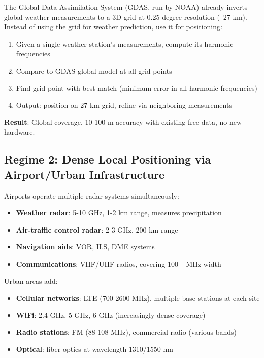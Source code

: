 \documentclass[11pt,twocolumn,a4paper]{article}
\theoremstyle{definition}
\begin{document}
The Global Data Assimilation System (GDAS, run by NOAA) already inverts global weather measurements to a 3D grid at 0.25-degree resolution (~27 km). Instead of using the grid for weather prediction, use it for positioning:

\begin{enumerate}[nosep]
\item Given a single weather station's measurements, compute its harmonic frequencies
\item Compare to GDAS global model at all grid points
\item Find grid point with best match (minimum error in all harmonic frequencies)
\item Output: position on 27 km grid, refine via neighboring measurements
\end{enumerate}

\textbf{Result}: Global coverage, 10-100 m accuracy with existing free data, no new hardware.

\subsection{Regime 2: Dense Local Positioning via Airport/Urban Infrastructure}

Airports operate multiple radar systems simultaneously:
\begin{itemize}[nosep]
\item \textbf{Weather radar}: 5-10 GHz, 1-2 km range, measures precipitation
\item \textbf{Air-traffic control radar}: 2-3 GHz, 200 km range
\item \textbf{Navigation aids}: VOR, ILS, DME systems
\item \textbf{Communications}: VHF/UHF radios, covering 100+ MHz width
\end{itemize}

Urban areas add:
\begin{itemize}[nosep]
\item \textbf{Cellular networks}: LTE (700-2600 MHz), multiple base stations at each site
\item \textbf{WiFi}: 2.4 GHz, 5 GHz, 6 GHz (increasingly dense coverage)
\item \textbf{Radio stations}: FM (88-108 MHz), commercial radio (various bands)
\item \textbf{Optical}: fiber optics at wavelength 1310/1550 nm
\end{itemize}
\end{document}

